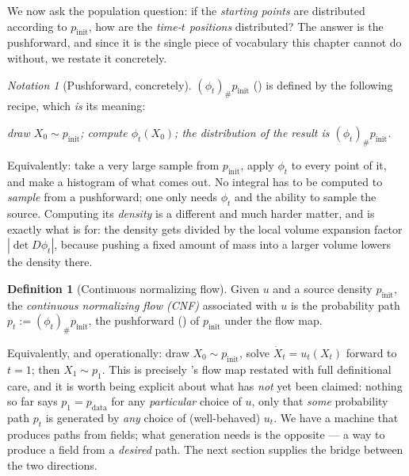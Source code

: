 \documentclass[11pt,a4paper]{report}
\theoremstyle{definition}
\newtheorem{definition}[definition]{Definition}
\theoremstyle{remark}
\newtheorem{notation}[notation]{Notation}
\begin{document}
We now ask the population question: if the \emph{starting points} are
distributed according to $p_{\mathrm{init}}$, how are the \emph{time-$t$
positions} distributed? The answer is the pushforward, and since it is the
single piece of vocabulary this chapter cannot do without, we restate it
concretely.

\begin{notation}[Pushforward, concretely]
\label{not:pushforward-concrete}
$(\phi_t)_\#p_{\mathrm{init}}$ () is defined by the
following recipe, which \emph{is} its meaning:

\begin{center}
\emph{draw $X_0\sim p_{\mathrm{init}}$; compute $\phi_t(X_0)$; the
distribution of the result is $(\phi_t)_\#p_{\mathrm{init}}$.}
\end{center}

Equivalently: take a very large sample from $p_{\mathrm{init}}$, apply
$\phi_t$ to every point of it, and make a histogram of what comes out. No
integral has to be computed to \emph{sample} from a pushforward; one only
needs $\phi_t$ and the ability to sample the source. Computing its
\emph{density} is a different and much harder matter, and is exactly what
 is for: the density gets divided by the
local volume expansion factor $|\det D\phi_t|$, because pushing a fixed
amount of mass into a larger volume lowers the density there.
\end{notation}

\begin{definition}[Continuous normalizing flow]
\label{def:cnf}
Given $u$ and a source density $p_{\mathrm{init}}$, the
\emph{continuous normalizing flow (CNF)} associated with $u$ is the
probability path $p_t := (\phi_t)_\#p_{\mathrm{init}}$, the pushforward
() of $p_{\mathrm{init}}$ under the flow map.
\end{definition}

Equivalently, and operationally: draw $X_0\sim p_{\mathrm{init}}$, solve
$\dot X_t=u_t(X_t)$ forward to $t=1$; then $X_1\sim p_1$. This is precisely
's flow map restated with full definitional
care, and it is worth being explicit about what has \emph{not} yet been
claimed:
nothing so far says $p_1=p_{\mathrm{data}}$ for any \emph{particular}
choice of $u$, only that \emph{some} probability path $p_t$ is generated by
\emph{any} choice of (well-behaved) $u_t$. We have a machine that produces
paths from fields; what generation needs is the opposite --- a way to
produce a field from a \emph{desired} path. The next section supplies the
bridge between the two directions.
\end{document}
